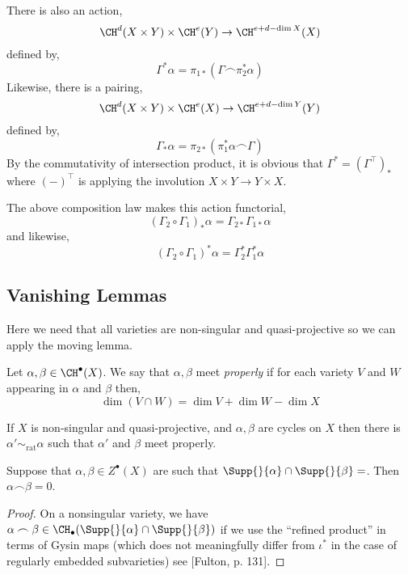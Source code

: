 \documentclass[12pt]{article}
\begin{document}
There is also an action,
\[ \CH^{d}(X \times Y) \times \CH^{e}(Y) \to \CH^{e+d-\dim{X}}(X) \]
defined by,
\[ \Gamma^* \alpha = \pi_{1*} (\Gamma \frown \pi_2^* \alpha) \]
Likewise, there is a pairing,
\[ \CH^{d}(X \times Y) \times \CH^{e}(X) \to \CH^{e+d-\dim{Y}}(Y) \]
defined by,
\[ \Gamma_* \alpha = \pi_{2*}(\pi_1^* \alpha \frown \Gamma) \]
By the commutativity of intersection product, it is obvious that $\Gamma^* = (\Gamma^\top)_*$ where $(-)^\top$ is applying the involution $X \times Y \to Y \times X$.

\begin{lemma}
The above composition law makes this action functorial,
\[ (\Gamma_2 \circ \Gamma_1)_* \alpha = \Gamma_{2*} \Gamma_{1*} \alpha \]
and likewise,
\[ (\Gamma_2 \circ \Gamma_1)^* \alpha = \Gamma_2^* \Gamma_1^* \alpha \]
\end{lemma}

\subsection{Vanishing Lemmas}

Here we need that all varieties are non-singular and quasi-projective so we can apply the moving lemma.

\begin{defn}
Let $\alpha, \beta \in \CH^{\bullet}(X)$. We say that $\alpha, \beta$ meet \textit{properly} if for each variety $V$ and $W$ appearing in $\alpha$ and $\beta$ then,
\[ \dim{(V \cap W)} = \dim{V} + \dim{W} - \dim{X} \]
\end{defn}

\begin{theorem}
If $X$ is non-singular and quasi-projective, and $\alpha, \beta$ are cycles on $X$ then there is $\alpha' \sim_{\text{rat}} \alpha$ such that $\alpha'$ and $\beta$ meet properly. 
\end{theorem}

\begin{prop}
Suppose that $\alpha, \beta \in Z^{\bullet}(X)$ are such that $\Supp{}{\alpha} \cap \Supp{}{\beta} = \empty$. Then $\alpha \frown \beta = 0$.
\end{prop}

\begin{proof}
On a nonsingular variety, we have $\alpha \frown \beta \in \CH_\bullet(\Supp{}{\alpha} \cap \Supp{}{\beta})$ if we use the ``refined product'' in terms of Gysin maps (which does not meaningfully differ from $\iota^*$ in the case of regularly embedded subvarieties) see [Fulton, p. 131].
\end{proof}
\end{document}

